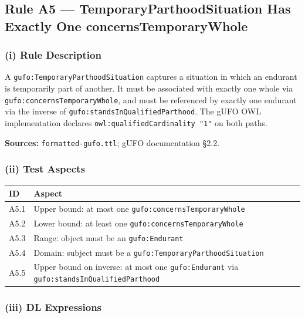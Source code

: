 \documentclass[12pt,a4paper]{article}
\newcommand{\gufoclass}[1]{\nolinkurl{gufo:#1}}
\newcommand{\gufoprop}[1]{\nolinkurl{gufo:#1}}
\begin{document}
\subsection{Rule A5 --- TemporaryParthoodSituation Has Exactly One concernsTemporaryWhole}
\label{sec:rule-a5}

\subsubsection*{(i) Rule Description}

A \gufoclass{TemporaryParthoodSituation} captures a situation in which an
endurant is temporarily part of another. It must be associated with exactly one
whole via \gufoprop{concernsTemporaryWhole}, and must be referenced by exactly
one endurant via the inverse of \gufoprop{standsInQualifiedParthood}. The gUFO
OWL implementation declares \nolinkurl{owl:qualifiedCardinality "1"} on both paths.

\textbf{Sources:} \texttt{formatted-gufo.ttl}; gUFO documentation \S2.2.

\subsubsection*{(ii) Test Aspects}

\begin{tabular}{lL{9.5cm}}
  \toprule
  \textbf{ID} & \textbf{Aspect} \\
  \midrule
  A5.1 & Upper bound: at most one \gufoprop{concernsTemporaryWhole} \\
  A5.2 & Lower bound: at least one \gufoprop{concernsTemporaryWhole} \\
  A5.3 & Range: object must be an \gufoclass{Endurant} \\
  A5.4 & Domain: subject must be a \gufoclass{TemporaryParthoodSituation} \\
  A5.5 & Upper bound on inverse: at most one \gufoclass{Endurant} via
         \gufoprop{standsInQualifiedParthood} \\
  \bottomrule
\end{tabular}

\subsubsection*{(iii) DL Expressions}
\end{document}
